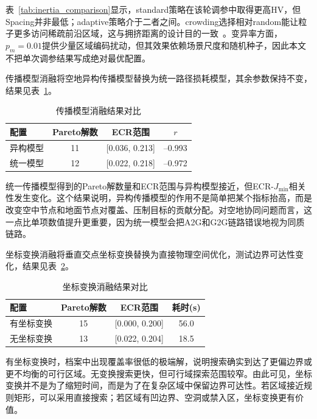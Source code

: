 表~\ref{tab:inertia_comparison}显示，standard策略在该轮调参中取得更高HV，但Spacing并非最低；adaptive策略介于二者之间。crowding选择相对random能让粒子更多访问稀疏前沿区域，这与拥挤距离的设计目的一致~\cite{Deb2002,Raquel2005}。变异率方面，$p_m=0.01$提供少量区域编码扰动，但其效果依赖场景尺度和随机种子，因此本文不把单次调参结果写成绝对最优配置。

传播模型消融将空地异构传播模型替换为统一路径损耗模型，其余参数保持不变，结果见表~\ref{tab:ablation_prop}。

\begin{table}[!htbp]
\centering
\small
\caption{传播模型消融结果对比}
\label{tab:ablation_prop}
\begin{tabular}{lccc}
\toprule
配置 & Pareto解数 & ECR范围 & $r$ \\
\midrule
异构模型 & 11 & [0.036, 0.213] & --0.993 \\
统一模型 & 12 & [0.022, 0.218] & --0.972 \\
\bottomrule
\end{tabular}
\end{table}

统一传播模型得到的Pareto解数量和ECR范围与异构模型接近，但ECR-$J_{\min}$相关性发生变化。这个结果说明，异构传播模型的作用不是简单把某个指标抬高，而是改变空中节点和地面节点对覆盖、压制目标的贡献分配。对空地协同问题而言，这一点比单项数值提升更重要，因为统一模型会把A2G和G2G链路错误地视为同质链路。

坐标变换消融将垂直交点坐标变换替换为直接物理空间优化，测试边界可达性变化，结果见表~\ref{tab:ablation_transform}。

\begin{table}[!htbp]
\centering
\small
\caption{坐标变换消融结果对比}
\label{tab:ablation_transform}
\begin{tabular}{lccc}
\toprule
配置 & Pareto解数 & ECR范围 & 耗时(s) \\
\midrule
有坐标变换 & 15 & [0.000, 0.200] & 56.0 \\
无坐标变换 & 13 & [0.022, 0.204] & 18.5 \\
\bottomrule
\end{tabular}
\end{table}

有坐标变换时，档案中出现覆盖率很低的极端解，说明搜索确实到达了更偏边界或更不均衡的可行区域。无变换搜索更快，但可行域探索范围较窄。由此可见，坐标变换并不是为了缩短时间，而是为了在复杂区域中保留边界可达性。若区域接近规则矩形，可以采用直接搜索；若区域有凹边界、空洞或禁入区，坐标变换更有价值。

